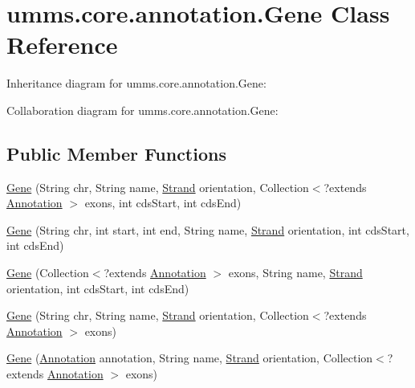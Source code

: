 \hypertarget{classumms_1_1core_1_1annotation_1_1_gene}{\section{umms.\+core.\+annotation.\+Gene Class Reference}
\label{classumms_1_1core_1_1annotation_1_1_gene}
}


Inheritance diagram for umms.\+core.\+annotation.\+Gene\+:


Collaboration diagram for umms.\+core.\+annotation.\+Gene\+:
\subsection*{Public Member Functions}
\begin{DoxyCompactItemize}
\item 
\hyperlink{classumms_1_1core_1_1annotation_1_1_gene_ad01f83ff26c705d38847795f21b18da4}{Gene} (String chr, String name, \hyperlink{enumumms_1_1core_1_1annotation_1_1_annotation_1_1_strand}{Strand} orientation, Collection$<$?extends \hyperlink{interfaceumms_1_1core_1_1annotation_1_1_annotation}{Annotation} $>$ exons, int cds\+Start, int cds\+End)
\item 
\hyperlink{classumms_1_1core_1_1annotation_1_1_gene_a548a0f54773a11fdf300e222dfe10408}{Gene} (String chr, int start, int end, String name, \hyperlink{enumumms_1_1core_1_1annotation_1_1_annotation_1_1_strand}{Strand} orientation, int cds\+Start, int cds\+End)
\item 
\hyperlink{classumms_1_1core_1_1annotation_1_1_gene_af7735ab84754cd8b0c1433a5c298a240}{Gene} (Collection$<$?extends \hyperlink{interfaceumms_1_1core_1_1annotation_1_1_annotation}{Annotation} $>$ exons, String name, \hyperlink{enumumms_1_1core_1_1annotation_1_1_annotation_1_1_strand}{Strand} orientation, int cds\+Start, int cds\+End)
\item 
\hyperlink{classumms_1_1core_1_1annotation_1_1_gene_a4760d6a21c595f91ae12c6df771406b2}{Gene} (String chr, String name, \hyperlink{enumumms_1_1core_1_1annotation_1_1_annotation_1_1_strand}{Strand} orientation, Collection$<$?extends \hyperlink{interfaceumms_1_1core_1_1annotation_1_1_annotation}{Annotation} $>$ exons)
\item 
\hyperlink{classumms_1_1core_1_1annotation_1_1_gene_a01c6565a17c3cb35ab7027f1c65d323a}{Gene} (\hyperlink{interfaceumms_1_1core_1_1annotation_1_1_annotation}{Annotation} annotation, String name, \hyperlink{enumumms_1_1core_1_1annotation_1_1_annotation_1_1_strand}{Strand} orientation, Collection$<$?extends \hyperlink{interfaceumms_1_1core_1_1annotation_1_1_annotation}{Annotation} $>$ exons)

\end{DoxyCompactItemize}

